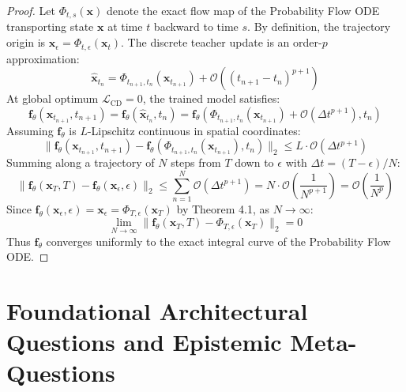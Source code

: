 \documentclass[11pt,a4paper]{article}
\theoremstyle{definition}
\begin{document}
\begin{proof}
Let $\Phi_{t, s}(\mathbf{x})$ denote the exact flow map of the Probability Flow ODE transporting state $\mathbf{x}$ at time $t$ backward to time $s$.
By definition, the trajectory origin is $\mathbf{x}_\epsilon = \Phi_{t, \epsilon}(\mathbf{x}_t)$.
The discrete teacher update is an order-$p$ approximation:
{\boldmath
\begin{equation}
\hat{\mathbf{x}}_{t_n} = \Phi_{t_{n+1}, t_n}(\mathbf{x}_{t_{n+1}}) + \mathcal{O}((t_{n+1} - t_n)^{p+1})
\end{equation}
}
At global optimum $\mathcal{L}_{\text{CD}} = 0$, the trained model satisfies:
{\boldmath
\begin{equation}
\mathbf{f}_\theta(\mathbf{x}_{t_{n+1}}, t_{n+1}) = \mathbf{f}_\theta(\hat{\mathbf{x}}_{t_n}, t_n) = \mathbf{f}_\theta\left( \Phi_{t_{n+1}, t_n}(\mathbf{x}_{t_{n+1}}) + \mathcal{O}(\Delta t^{p+1}), t_n \right)
\end{equation}
}
Assuming $\mathbf{f}_\theta$ is $L$-Lipschitz continuous in spatial coordinates:
{\boldmath
\begin{equation}
\|\mathbf{f}_\theta(\mathbf{x}_{t_{n+1}}, t_{n+1}) - \mathbf{f}_\theta(\Phi_{t_{n+1}, t_n}(\mathbf{x}_{t_{n+1}}), t_n)\|_2 \le L \cdot \mathcal{O}(\Delta t^{p+1})
\end{equation}
}
Summing along a trajectory of $N$ steps from $T$ down to $\epsilon$ with $\Delta t = (T - \epsilon)/N$:
{\boldmath
\begin{equation}
\|\mathbf{f}_\theta(\mathbf{x}_T, T) - \mathbf{f}_\theta(\mathbf{x}_\epsilon, \epsilon)\|_2 \le \sum_{n=1}^N \mathcal{O}(\Delta t^{p+1}) = N \cdot \mathcal{O}\left( \frac{1}{N^{p+1}} \right) = \mathcal{O}\left( \frac{1}{N^p} \right)
\end{equation}
}
Since $\mathbf{f}_\theta(\mathbf{x}_\epsilon, \epsilon) = \mathbf{x}_\epsilon = \Phi_{T, \epsilon}(\mathbf{x}_T)$ by Theorem 4.1, as $N \to \infty$:
{\boldmath
\begin{equation}
\lim_{N \to \infty} \|\mathbf{f}_\theta(\mathbf{x}_T, T) - \Phi_{T, \epsilon}(\mathbf{x}_T)\|_2 = 0
\end{equation}
}
Thus $\mathbf{f}_\theta$ converges uniformly to the exact integral curve of the Probability Flow ODE.
\end{proof}

\section{Foundational Architectural Questions and Epistemic Meta-Questions}
\end{document}

